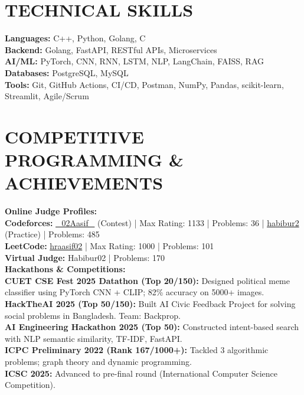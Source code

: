 \section*{TECHNICAL SKILLS}
\vspace{-2pt}
\textbf{Languages: } C++, Python, Golang, C\\
\textbf{Backend:  } Golang, FastAPI, RESTful APIs, Microservices\\
\textbf{AI/ML:} PyTorch, CNN, RNN, LSTM, NLP, LangChain, FAISS, RAG\\
\textbf{Databases: } PostgreSQL, MySQL\\
\textbf{Tools:} Git, GitHub Actions, CI/CD, Postman, NumPy, Pandas, scikit-learn, Streamlit, Agile/Scrum
\vspace{1pt}

\section*{COMPETITIVE PROGRAMMING \& ACHIEVEMENTS}
\vspace{-2pt}

\textbf{Online Judge Profiles: }\\
\textbf{Codeforces:} \href{https://codeforces.com/profile/_02Aasif_}{\_02Aasif\_} (Contest) | Max Rating: 1133 | Problems:  36 | \href{https://codeforces.com/profile/habibur2}{habibur2} (Practice) | Problems: 485\\
\textbf{LeetCode:} \href{https://leetcode.com/u/hraasif02/}{hraasif02} | Max Rating: 1000 | Problems: 101\\
\textbf{Virtual Judge:} Habibur02 | Problems: 170\\[3pt]

\textbf{Hackathons \& Competitions:}\\
\textbf{CUET CSE Fest 2025 Datathon (Top 20/150):} Designed political meme classifier using PyTorch CNN + CLIP; 82\% accuracy on 5000+ images.\\
\textbf{HackTheAI 2025 (Top 50/150):} Built AI Civic Feedback Project for solving social problems in Bangladesh. Team: Backprop.\\
\textbf{AI Engineering Hackathon 2025 (Top 50):} Constructed intent-based search with NLP semantic similarity, TF-IDF, FastAPI.\\
\textbf{ICPC Preliminary 2022 (Rank 167/1000+):} Tackled 3 algorithmic problems; graph theory and dynamic programming.\\
\textbf{ICSC 2025:} Advanced to pre-final round (International Computer Science Competition).

